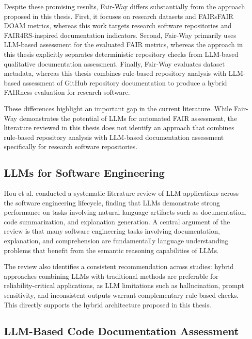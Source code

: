 Despite these promising results, Fair-Way differs substantially from
the approach proposed in this thesis. First, it focuses on research
datasets and FAIRsFAIR DOAM metrics, whereas this work targets research
software repositories and FAIR4RS-inspired documentation indicators.
Second, Fair-Way primarily uses LLM-based assessment for the evaluated FAIR
metrics, whereas the approach in this thesis explicitly separates
deterministic repository checks from LLM-based qualitative
documentation assessment. Finally, Fair-Way evaluates dataset metadata, whereas
this thesis combines rule-based repository analysis with LLM-based
assessment of GitHub repository documentation to produce a hybrid
FAIRness evaluation for research software.

These differences highlight an important gap in the current literature.
While Fair-Way demonstrates the potential of LLMs for automated FAIR
assessment, the literature reviewed in this thesis does not identify
an approach that combines rule-based repository analysis with
LLM-based documentation assessment specifically for research software
repositories.

\subsection{LLMs for Software Engineering}

Hou et al. \cite{hou2024llmse} conducted a systematic literature 
review of LLM applications across the software engineering lifecycle, 
finding that LLMs demonstrate strong performance on tasks involving 
natural language artifacts such as documentation, code summarization, 
and explanation generation. A central argument of the review is that 
many software engineering tasks involving documentation, explanation, 
and comprehension are fundamentally language understanding problems 
that benefit from the semantic reasoning capabilities of LLMs.

The review also identifies a consistent recommendation across 
studies: hybrid approaches combining LLMs with traditional methods 
are preferable for reliability-critical applications, as LLM 
limitations such as hallucination, prompt sensitivity, and 
inconsistent outputs warrant complementary rule-based checks. This 
directly supports the hybrid architecture proposed in this thesis.

\subsection{LLM-Based Code Documentation Assessment}

